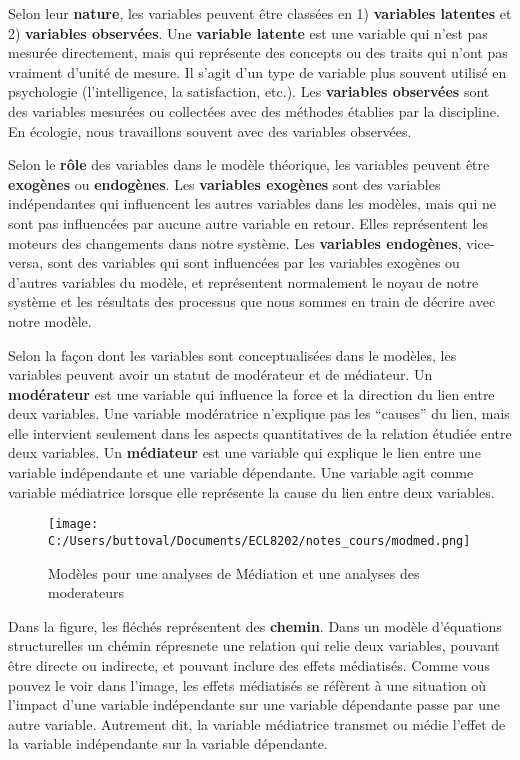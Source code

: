 \documentclass[
]{article}
\begin{document}
Selon leur \textbf{nature}, les variables peuvent être classées en 1)
\textbf{variables latentes} et 2) \textbf{variables observées}. Une
\textbf{variable latente} est une variable qui n'est pas mesurée
directement, mais qui représente des concepts ou des traits qui n'ont
pas vraiment d'unité de mesure. Il s'agit d'un type de variable plus
souvent utilisé en psychologie (l'intelligence, la satisfaction, etc.).
Les \textbf{variables observées} sont des variables mesurées ou
collectées avec des méthodes établies par la discipline. En écologie,
nous travaillons souvent avec des variables observées.

Selon le \textbf{rôle} des variables dans le modèle théorique, les
variables peuvent être \textbf{exogènes} ou \textbf{endogènes}. Les
\textbf{variables exogènes} sont des variables indépendantes qui
influencent les autres variables dans les modèles, mais qui ne sont pas
influencées par aucune autre variable en retour. Elles représentent les
moteurs des changements dans notre système. Les \textbf{variables
endogènes}, vice-versa, sont des variables qui sont influencées par les
variables exogènes ou d'autres variables du modèle, et représentent
normalement le noyau de notre système et les résultats des processus que
nous sommes en train de décrire avec notre modèle.

Selon la façon dont les variables sont conceptualisées dans le modèles,
les variables peuvent avoir un statut de modérateur et de médiateur. Un
\textbf{modérateur} est une variable qui influence la force et la
direction du lien entre deux variables. Une variable modératrice
n'explique pas les ``causes'' du lien, mais elle intervient seulement
dans les aspects quantitatives de la relation étudiée entre deux
variables. Un \textbf{médiateur} est une variable qui explique le lien
entre une variable indépendante et une variable dépendante. Une variable
agit comme variable médiatrice lorsque elle représente la cause du lien
entre deux variables.

\begin{figure}
\centering
\texttt{[image: C:/Users/buttoval/Documents/ECL8202/notes\_cours/modmed.png]}
\caption{Modèles pour une analyses de Médiation et une analyses des
moderateurs}
\end{figure}

Dans la figure, les fléchés représentent des \textbf{chemin}. Dans un
modèle d'équations structurelles un chémin répresnete une relation qui
relie deux variables, pouvant être directe ou indirecte, et pouvant
inclure des effets médiatisés. Comme vous pouvez le voir dans l'image,
les effets médiatisés se réfèrent à une situation où l'impact d'une
variable indépendante sur une variable dépendante passe par une autre
variable. Autrement dit, la variable médiatrice transmet ou médie
l'effet de la variable indépendante sur la variable dépendante.
\end{document}
